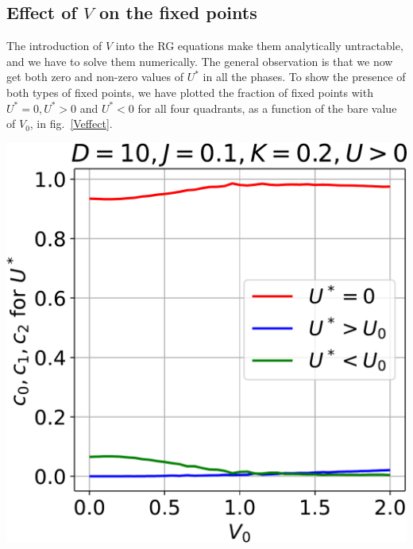 \documentclass[12pt,twoside]{article}
\numberwithin{equation}{section}
\begin{document}
\subsection{Effect of \(V\) on the fixed points}
The introduction of \(V\) into the RG equations make them analytically untractable, and we have to solve them numerically. The general observation is that we now get both zero and non-zero values of \(U^*\) in all the phases. To show the presence of both types of fixed points, we have plotted the fraction of fixed points with \(U^* = 0, U^*>0\) and \(U^*<0\) for all four quadrants, as a function of the bare value of \(V_0\), in fig.~\ref{Veffect}.
\begin{center}
\begin{minipage}{.49\textwidth}
    \centering
    \includegraphics[scale=0.38]{../figures/quad2.pdf}
\end{minipage}
\begin{minipage}{.49\textwidth}
    \centering

\end{minipage}
\end{center}
\end{document}

